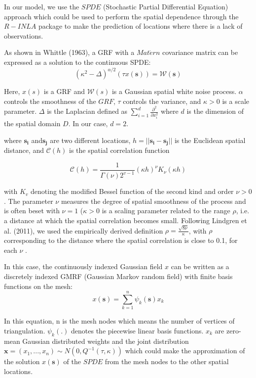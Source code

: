 \documentclass{mcmthesis}
\begin{document}
In our model, we use the $SPDE$ (Stochastic Partial Differential Equation) approach which could be used to perform the spatial dependence through the $R-INLA$ package to make the prediction of locations where there is a lack of observations. 

As shown in Whittle (1963), a GRF with a $Mat\acute{e}rn$ covariance matrix can be expressed as a solution to the  continuous SPDE:
\begin{equation}
    \left(\kappa^{2}-\Delta\right)^{\alpha / 2}(\tau x(\boldsymbol{s}))=\mathcal{W}(\boldsymbol{s})
\end{equation}

Here,  $x(s)$  is a GRF and $ \mathcal{W}(s)$  is a Gaussian spatial white noise process.  $\alpha$  controls the smoothness of the $GRF$,  $\tau$  controls the variance, and  $\kappa>0$  is a scale parameter.  $\Delta$  is the Laplacian defined as  $\sum_{i=1}^{d} \frac{\partial^{2}}{\partial x_{i}^{2}}$  where  $d$  is the dimension of the spatial domain  $D$. In our case, $d=2$. 

where $\mathbf{s_i}$ and$\mathbf{s_j}$  are two different locations, $ h=||\mathbf{s_i}-\mathbf{s_j}||$ is the Euclidean spatial distance, and $\mathcal{C}(h)$ is the spatial correlation function

\begin{equation}
    \mathcal{C}(h)=\frac{1}{\Gamma(\nu) 2^{v-1}}(\kappa h)^{\nu} K_{\nu}(\kappa h)
\end{equation}

with $K_{v}$ denoting the modified Bessel function of the second kind and order $ \nu>0$ . The parameter $\nu$ measures the degree of spatial smoothness of the process and is often beset with $ \nu =1$ ($\kappa > 0$ is a scaling parameter related to the range $ \rho$, i.e. a distance at which the spatial correlation becomes small. Following Lindgren et al. (2011), we used the empirically derived definition $ \rho = \frac{\sqrt{ 8\nu}}{\kappa}$, with $\rho$ corresponding to the distance where the spatial correlation is close to 0.1, for each $\nu$ . 

In this case, the continuously indexed Gaussian field $x$ can be written as a discretely indexed GMRF (Gaussian Markov random field) with finite basis functions on the mesh:
\begin{equation}
    x(\boldsymbol{s})=\sum_{k=1}^{n} \psi_{k}(\boldsymbol{s}) x_{k}
\end{equation}

In this equation, n is the mesh nodes which means the number of vertices of triangulation. $\psi_{k}(\boldsymbol{.})$ denotes the piecewise linear basis functions. ${x_k}$ are zero-mean Gaussian distributed weights and the joint distribution $\mathbf{x} = (x_1,...,x_n) \sim N(0,Q^{-1}(\tau, \kappa))$ which could make the approximation of the solution $x(\mathbf{s})$ of the $SPDE$ from the mesh nodes to the other spatial locations. 
\end{document}
